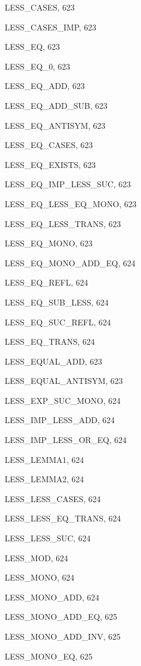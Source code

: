 \begin{theindex}
  \item {\ptt LESS\_CASES}, 623
  \item {\ptt LESS\_CASES\_IMP}, 623
  \item {\ptt LESS\_EQ}, 623
  \item {\ptt LESS\_EQ\_0}, 623
  \item {\ptt LESS\_EQ\_ADD}, 623
  \item {\ptt LESS\_EQ\_ADD\_SUB}, 623
  \item {\ptt LESS\_EQ\_ANTISYM}, 623
  \item {\ptt LESS\_EQ\_CASES}, 623
  \item {\ptt LESS\_EQ\_EXISTS}, 623
  \item {\ptt LESS\_EQ\_IMP\_LESS\_SUC}, 623
  \item {\ptt LESS\_EQ\_LESS\_EQ\_MONO}, 623
  \item {\ptt LESS\_EQ\_LESS\_TRANS}, 623
  \item {\ptt LESS\_EQ\_MONO}, 623
  \item {\ptt LESS\_EQ\_MONO\_ADD\_EQ}, 624
  \item {\ptt LESS\_EQ\_REFL}, 624
  \item {\ptt LESS\_EQ\_SUB\_LESS}, 624
  \item {\ptt LESS\_EQ\_SUC\_REFL}, 624
  \item {\ptt LESS\_EQ\_TRANS}, 624
  \item {\ptt LESS\_EQUAL\_ADD}, 623
  \item {\ptt LESS\_EQUAL\_ANTISYM}, 623
  \item {\ptt LESS\_EXP\_SUC\_MONO}, 624
  \item {\ptt LESS\_IMP\_LESS\_ADD}, 624
  \item {\ptt LESS\_IMP\_LESS\_OR\_EQ}, 624
  \item {\ptt LESS\_LEMMA1}, 624
  \item {\ptt LESS\_LEMMA2}, 624
  \item {\ptt LESS\_LESS\_CASES}, 624
  \item {\ptt LESS\_LESS\_EQ\_TRANS}, 624
  \item {\ptt LESS\_LESS\_SUC}, 624
  \item {\ptt LESS\_MOD}, 624
  \item {\ptt LESS\_MONO}, 624
  \item {\ptt LESS\_MONO\_ADD}, 624
  \item {\ptt LESS\_MONO\_ADD\_EQ}, 625
  \item {\ptt LESS\_MONO\_ADD\_INV}, 625
  \item {\ptt LESS\_MONO\_EQ}, 625

\end{theindex}
